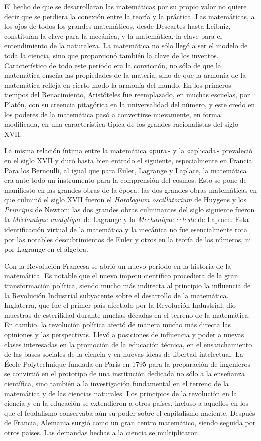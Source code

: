 \documentclass[a4paper, 12pt]{article}
\begin{document}
El hecho de que se desarrollaran las matemáticas por su propio valor no quiere
decir que se perdiera la conexión entre la teoría y la práctica. Las
matemáticas, a los ojos de todos los grandes matemáticos, desde Descartes hasta
Leibniz, constituían la clave para la mecánica; y la matemática, la clave para
el entendimiento de la naturaleza. La matemática no sólo llegó a ser el modelo
de toda la ciencia, sino que proporcionó también la clave de los inventos.
Característico de todo este período era la convicción, no sólo de que la
matemática enseña las propiedades de la materia, sino de que la armonía de la
matemática refleja en cierto modo la armonía del mundo. En los primeros tiempos
del Renacimiento, Aristóteles fue reemplazado, en muchas escuelas, por Platón,
con su creencia pitagórica en la universalidad del número, y este credo en los
poderes de la matemática pasó a convertirse nuevamente, en forma modificada, en
una característica típica de los grandes racionalistas del siglo XVII.

La misma relación íntima entre la matemática «pura» y la «aplicada»  prevaleció
en el siglo XVII y duró hasta bien entrado el siguiente, especialmente en
Francia. Para los Bernoulli, al igual que para Euler, Lagrange y Laplace, la
matemática era ante todo un instrumento para la comprensión del cosmos. Esto se
pone de manifiesto en las grandes obras de la época: las dos grandes obras
matemáticas en que culminó el siglo XVII fueron el \textit{Horologium
oscillatorium} de Huygens y los \textit{Principia} de Newton; las dos grandes
obras culminantes del siglo siguiente fueron la \textit{Méchanique analytique}
de Lagrange y la \textit{Mechanique celeste} de Laplace. Esta identificación
virtual de la matemática y la mecánica no fue esencialmente rota por las
notables descubrimientos de Euler y otros en la teoría de los números, ni por
Lagrange en el álgebra.

Con la Revolución Francesa se abrió un nuevo período en la historia de la
matemática. Es notable que el nuevo ímpetu científico procediera de la gran
transformación política, siendo mucho más indirecta al principio la influencia
de la Revolución Industrial subyacente sobre el desarrollo de la matemática.
Inglaterra, que fue el primer país afectado por la Revolución Industrial, dio
muestras de esterilidad durante muchas décadas en el terreno de la matemática.
En cambio, la revolución política afectó de manera mucho más directa las
opiniones y las perspectivas. Llevó a posiciones de influencia y poder a nuevas
clases interesadas en la promoción de la educación técnica, en el ensanchamiento
de las bases sociales de la ciencia y en nuevas ideas de libertad intelectual.
La École Polytechnique fundada en París en 1795 para la preparación de
ingenieros se convirtió en el prototipo de una institución dedicada no sólo a la
enseñanza científica, sino también a la investigación fundamental en el terreno
de la matemática y de las ciencias naturales. Los principios de la revolución en
la ciencia y en la educación se extendieron a otros países, incluso a aquellos
en los que el feudalismo conservaba aún su poder sobre el capitalismo naciente.
Después de Francia, Alemania surgió como un gran centro matemático, siendo
seguida por otros países. Las demandas hechas a la ciencia se multiplicaron.
\end{document}

